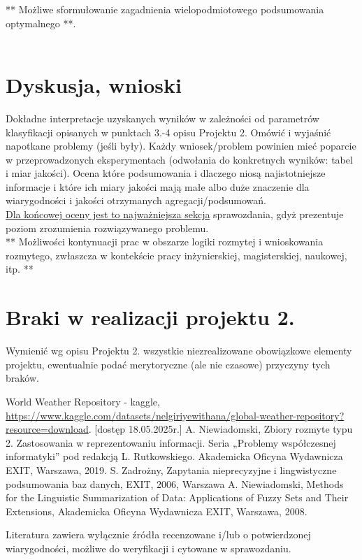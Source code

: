\documentclass{article}
\begin{document}
** Możliwe sformułowanie zagadnienia wielopodmiotowego podsumowania optymalnego **.\\
\\



\section{Dyskusja, wnioski}
Dokładne interpretacje uzyskanych wyników w zależności od parametrów klasyfikacji
opisanych w punktach 3.-4 opisu Projektu 2. 
Omówić i wyjaśnić napotkane problemy (jeśli były). Każdy wniosek/problem powinien mieć poparcie
w przeprowadzonych eksperymentach (odwołania do konkretnych wyników: tabel i miar
jakości). Ocena które podsumowania i dlaczego niosą najistotniejsze informacje
i które ich miary jakości mają małe albo duże znaczenie dla wiarygodności i jakości otrzymanych
agregacji/podsumowań.  \\
\underline{Dla końcowej oceny jest to najważniejsza sekcja} sprawozdania, gdyż prezentuje poziom
zrozumienia rozwiązywanego problemu.\\

** Możliwości kontynuacji prac w obszarze logiki rozmytej i wnioskowania rozmytego, zwłaszcza w kontekście pracy inżynierskiej,
magisterskiej, naukowej, itp. **\\



\section{Braki w realizacji projektu 2.}
Wymienić wg opisu Projektu 2. wszystkie niezrealizowane obowiązkowe elementy projektu, ewentualnie
podać merytoryczne (ale nie czasowe) przyczyny tych braków. 


\begin{thebibliography}{99}
 World Weather Repository - kaggle, \url{https://www.kaggle.com/datasets/nelgiriyewithana/global-weather-repository?resource=download}. [dostęp 18.05.2025r.]
  A. Niewiadomski, Zbiory rozmyte typu 2. Zastosowania w reprezentowaniu informacji.  Seria „Problemy współczesnej informatyki” pod redakcją L. Rutkowskiego. Akademicka Oficyna Wydawnicza EXIT, Warszawa, 2019.
 S. Zadrożny, Zapytania nieprecyzyjne i lingwistyczne podsumowania baz danych, EXIT, 2006, Warszawa
 A. Niewiadomski, Methods for the Linguistic Summarization of Data: Applications of Fuzzy Sets and Their Extensions, Akademicka Oficyna Wydawnicza EXIT, Warszawa, 2008.
\end{thebibliography}

Literatura zawiera wyłącznie źródła recenzowane i/lub o potwierdzonej wiarygodności,
możliwe do weryfikacji i cytowane w sprawozdaniu. 
\end{document}
